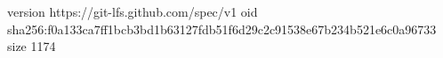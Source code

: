 version https://git-lfs.github.com/spec/v1
oid sha256:f0a133ca7ff1bcb3bd1b63127fdb51f6d29c2c91538e67b234b521e6c0a96733
size 1174
